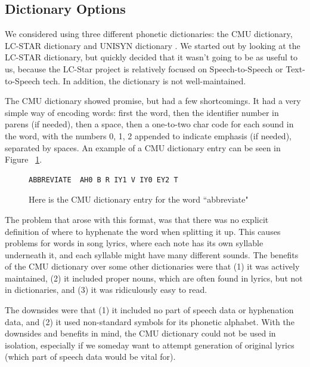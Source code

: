 \subsection{Dictionary Options}
\label{subsection:dictionaryOptions}

We considered using three different phonetic dictionaries: the CMU dictionary, LC-STAR dictionary and UNISYN dictionary\cite{lcStarWebsite} \cite{cmuDictWebsite}  \cite{unisynLexiconWebsite}.  We started out by looking at the LC-STAR dictionary, but quickly decided that it wasn’t going to be as useful to us, because the LC-Star project is relatively focused on Speech-to-Speech or Text-to-Speech tech. In addition, the dictionary is not well-maintained.  

The CMU dictionary showed promise, but had a few shortcomings.  It had a very simple way of encoding words:  first the word, then the identifier number in parens (if needed), then a space, then a one-to-two char code for each sound in the word, with the numbers 0, 1, 2 appended to indicate emphasis (if needed), separated by spaces.  An example of a CMU dictionary entry can be seen in Figure ~\ref{fig:CMUdictAbbreviate}.

\begin{figure}
\begin{center}
\begin{verbatim}
ABBREVIATE  AH0 B R IY1 V IY0 EY2 T
\end{verbatim}
\captionfonts
\caption[CMU dictionary entry example]{Here is the CMU dictionary entry for the word ``abbreviate" }
\label{fig:CMUdictAbbreviate}
\end{center}
\end{figure}

The problem that arose with this format, was that there was no explicit definition of where to hyphenate the word when splitting it up.  This causes problems for words in song lyrics, where each note has its own syllable underneath it, and each syllable might have many different sounds. 
The benefits of the CMU dictionary over some other dictionaries were that (1) it was actively maintained, (2) it included proper nouns, which are often found in lyrics, but not in dictionaries, and (3) it was ridiculously easy to read.

The downsides were that (1) it included no part of speech data or hyphenation data, and (2) it used non-standard symbols for its phonetic alphabet.  
With the downsides and benefits in mind, the CMU dictionary could not be used in isolation, especially if we someday want to attempt generation of original lyrics (which part of speech data would be vital for).  

